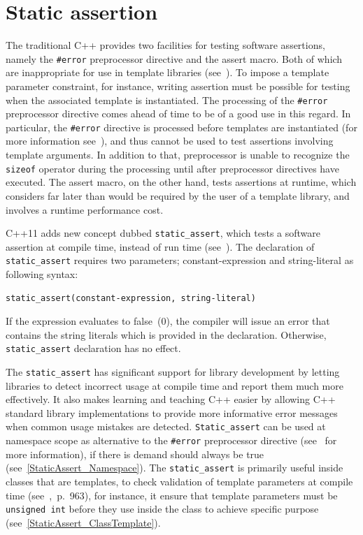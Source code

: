 \documentclass[11pt]{report}
\begin{document}
\section{Static assertion}
\label{section: Static assertion}
The traditional C++ provides two facilities for testing software assertions, namely the \texttt{\#error} preprocessor directive and the assert macro. Both of which are inappropriate for use in template libraries (see~\cite{Stroustrup:2012:Cpp11}). To impose a template parameter constraint, for instance, writing assertion must be possible for testing when the associated template is instantiated. The processing of the \texttt{\#error} preprocessor directive comes ahead of time to be of a good use in this regard. In particular, the \texttt{\#error} directive is processed before templates are instantiated (for more information see~\cite{Stroustrup:2012:Cpp11}), and thus cannot be used to test assertions involving template arguments. In addition to that, preprocessor is unable to recognize the \texttt{sizeof} operator during the processing until after preprocessor directives have executed. The assert macro, on the other hand, tests assertions at runtime, which considers far later than would be required by the user of a template library, and involves a runtime performance cost.

C++11 adds new concept dubbed \texttt{static\_assert}, which tests a software assertion at compile time, instead of run time (see~\cite{MSDN:2012:CppModern}). The declaration of \texttt{static\_assert} requires two parameters; constant-expression and string-literal as following syntax:
\begin{lstlisting}
static_assert(constant-expression, string-literal)
\end{lstlisting}
If the expression evaluates to false~(0), the compiler will issue an error that contains the string literals which is provided in the declaration. Otherwise, \texttt{static\_assert} declaration has no effect.

The \texttt{static\_assert} has significant support for library development by letting libraries to detect incorrect usage at compile time and report them much more effectively. It also makes learning and teaching C++ easier by allowing C++ standard library implementations to provide more informative error messages when common usage mistakes are detected. \texttt{Static\_assert} can be used at namespace scope as alternative to the \texttt{\#error} preprocessor directive (see~\cite{MSDN:2012:CppModern} for more information), if there is demand should always be true (see~\ref{StaticAssert_Namespace}). The \texttt{static\_assert} is primarily useful inside classes that are templates, to check validation of template parameters at compile time (see~\cite{Deitel:2012:CPP},~p.~963), for instance, it ensure that template parameters must be \texttt{unsigned int} before they use inside the class  to achieve specific purpose (see~\ref{StaticAssert_ClassTemplate}).
\end{document}
